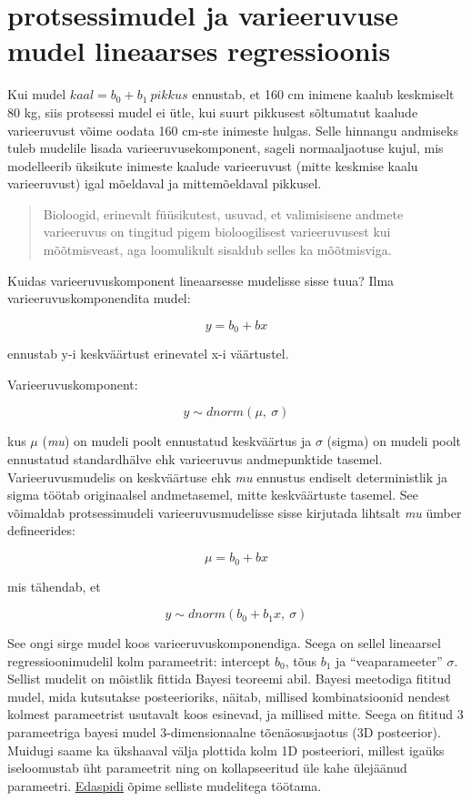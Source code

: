 \documentclass[]{book}
\begin{document}
\section{protsessimudel ja varieeruvuse mudel lineaarses
regressioonis}\label{protsessimudel-ja-varieeruvuse-mudel-lineaarses-regressioonis}

Kui mudel \(kaal = b_0 + b_1 ~pikkus\) ennustab, et 160 cm inimene
kaalub keskmiselt 80 kg, siis protsessi mudel ei ütle, kui suurt
pikkusest sõltumatut kaalude varieeruvust võime oodata 160 cm-ste
inimeste hulgas. Selle hinnangu andmiseks tuleb mudelile lisada
varieeruvusekomponent, sageli normaaljaotuse kujul, mis modelleerib
üksikute inimeste kaalude varieeruvust (mitte keskmise kaalu
varieeruvust) igal mõeldaval ja mittemõeldaval pikkusel.

\begin{quote}
Bioloogid, erinevalt füüsikutest, usuvad, et valimisisene andmete
varieeruvus on tingitud pigem bioloogilisest varieeruvusest kui
mõõtmisveast, aga loomulikult sisaldub selles ka mõõtmisviga.
\end{quote}

Kuidas varieeruvuskomponent lineaarsesse mudelisse sisse tuua? Ilma
varieeruvuskomponendita mudel:

\[y = b_0 + bx\]

ennustab y-i keskväärtust erinevatel x-i väärtustel.

Varieeruvuskomponent:

\[y\sim dnorm(\mu,~\sigma)\]

kus \(\mu\) (\emph{mu}) on mudeli poolt ennustatud keskväärtus ja
\(\sigma\) (sigma) on mudeli poolt ennustatud standardhälve ehk
varieeruvus andmepunktide tasemel. Varieeruvusmudelis on keskväärtuse
ehk \emph{mu} ennustus endiselt deterministlik ja sigma töötab
originaalsel andmetasemel, mitte keskväärtuste tasemel. See võimaldab
protsessimudeli varieeruvusmudelisse sisse kirjutada lihtsalt \emph{mu}
ümber defineerides:

\[\mu = b_0 + bx\]

mis tähendab, et

\[y \sim dnorm(b_0 + b_1x, ~\sigma)\]

See ongi sirge mudel koos varieeruvuskomponendiga. Seega on sellel
lineaarsel regressioonimudelil kolm parameetrit: intercept \(b_0\), tõus
\(b_1\) ja ``veaparameeter'' \(\sigma\). Sellist mudelit on mõistlik
fittida Bayesi teoreemi abil. Bayesi meetodiga fititud mudel, mida
kutsutakse posteerioriks, näitab, millised kombinatsioonid nendest
kolmest parameetrist usutavalt koos esinevad, ja millised mitte. Seega
on fititud 3 parameetriga bayesi mudel 3-dimensionaalne tõenäosusjaotus
(3D posteerior). Muidugi saame ka ükshaaval välja plottida kolm 1D
posteeriori, millest igaüks iseloomustab üht parameetrit ning on
kollapseeritud üle kahe ülejäänud parameetri. \href{pidev}{Edaspidi}
õpime selliste mudelitega töötama.
\end{document}
